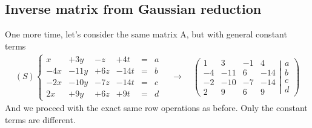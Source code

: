 \subsection*{Inverse matrix from Gaussian reduction}
One more time, let’s consider the same matrix A, but with general constant terms
\begin{align*}
(S)
\left\{
\begin{matrix}
    x &+  3y &-  z &+  4t &=&  a \\
  -4x &- 11y &+ 6z &- 14t &=&  b \\
  -2x &- 10y &- 7z &- 14t &=&  c \\
   2x &+  9y &+ 6z &+  9t &=&  d
\end{matrix}
\right.
\quad
\longrightarrow
\quad
\left(
	\begin{matrix}
	   1 &   3 & -1 &   4 \\
	  -4 & -11 &  6 & -14 \\
	  -2 & -10 & -7 & -14 \\
	   2 &   9 &  6 &   9
	\end{matrix}
  \left|
	\begin{matrix}
	  a \\
	  b \\
	  c \\
	  d
	\end{matrix}
  \right.
\right)
\end{align*}
And we proceed with the exact same row operations as before. Only the constant
terms are different.
